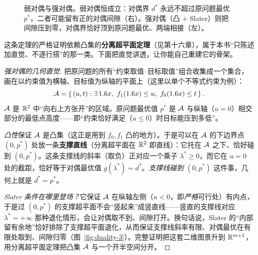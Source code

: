 \begin{figure}[h]
\caption{弱对偶与强对偶。弱对偶恒成立：对偶界 $d^*$ 永远不超过原问题最优 $p^*$，二者可能留有正的对偶间隙（右）。强对偶（凸 $+$ Slater）则把间隙压到零，对偶界恰好顶到原问题最优、两端相接（左）。}
\label{fig:duality-1}
\end{figure}



这条定理的严格证明依赖凸集的\textbf{分离超平面定理}（见第十六章），属于本书``只陈述加直觉、不逐行搭''的那一类。下面把直觉讲透，让你能自己重建它的骨架。

\begin{proof}[强对偶的几何直觉]
把原问题的所有``约束取值--目标取值''组合收集成一个集合，画在以约束值为横轴、目标值为纵轴的平面上（这里以单个不等式约束为例）：
\[
    \mathcal{A}=\left\{\,(u,t) : \exists\,1.6 x,\ f_1(1.6 x)\le u,\ f_0(1.6 x)\le t\,\right\} .
\]
$\mathcal{A}$ 是 $\mathbb{R}^2$ 中``向右上方张开''的区域。原问题最优值 $p^*$ 是 $\mathcal{A}$ 与纵轴（$u=0$）相交部分的最低点高度——即``约束恰好满足（$u\le 0$）时目标能压到多低''。

\emph{凸性}保证 $\mathcal{A}$ 是凸集（这正是用到 $f_0,f_1$ 凸的地方）。于是可以在 $\mathcal{A}$ 的下边界点 $(0,p^*)$ 处放一条\textbf{支撑直线}（分离超平面在 $\mathbb{R}^2$ 即直线）：它托在 $\mathcal{A}$ 之下、恰好碰到 $(0,p^*)$。这条支撑线的斜率（取负）正对应一个乘子 $\lambda^*\ge 0$，而它在 $u=0$ 处的截距，恰好等于对偶最优值 $g(\lambda^*)=d^*$。\emph{支撑线碰到 $(0,p^*)$} 这件事，几何上就是 $d^*=p^*$。

\emph{Slater 条件在哪里登场？}它保证 $\mathcal{A}$ 在纵轴左侧（$u<0$，即\emph{严格}可行处）有内点，于是过 $(0,p^*)$ 的支撑超平面不会``竖起来''成竖直线——竖直的支撑线对应 $\lambda^*=+\infty$ 那种退化情形，会让对偶取不到、间隙打开。换句话说，Slater 的``内部留有余地''恰好排除了支撑超平面退化，从而保证支撑线斜率有限、对偶最优在有限处取到、间隙归零（图~\ref{fig:duality-3}）。完整证明把这套二维图景升到 $\mathbb{R}^{m+1}$，用分离超平面定理把凸集 $\mathcal{A}$ 与一个开半空间分开。
\end{proof}

